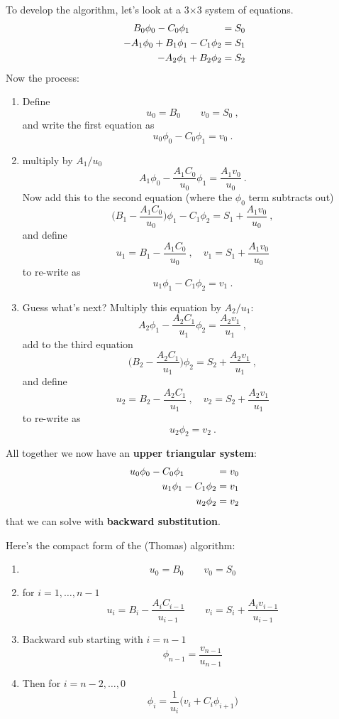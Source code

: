 \documentclass[12pt]{article}
\begin{document}
To develop the algorithm, let's look at a 3$\times$3 system of equations.
\begin{align}
B_0\phi_0 - C_0\phi_1 \hspace*{3.25em}&= S_0 \nonumber \\
-A_1\phi_0 + B_1\phi_1 - C_1\phi_2 &= S_1 \nonumber \\
-A_2\phi_1 + B_2\phi_2 &= S_2 \nonumber 
\end{align}
%
Now the process:
\begin{enumerate}
\item Define
\[u_0 = B_0 \qquad v_0 = S_0\:,\]
and write the first equation as
\[u_0\phi_0 - C_0\phi_1 = v_0\:.\]

\item multiply by $A_1 / u_0$
\[A_1\phi_0 - \frac{A_1 C_0}{u_0}\phi_1 = \frac{A_1 v_0}{u_0}\:.\]
Now add this to the second equation (where the $\phi_0$ term subtracts out)
\[\biggl(B_1-\frac{A_1 C_0}{u_0}\biggr)\phi_1 - C_1\phi_2 = S_1 + \frac{A_1 v_0}{u_0}\:,\]
%
and define
\[u_1 = B_1-\frac{A_1 C_0}{u_0}\:, \quad v_1 = S_1 + \frac{A_1 v_0}{u_0}\]
to re-write as
\[u_1\phi_1 - C_1\phi_2 = v_1\:.\]

\item Guess what's next? Multiply this equation by $A_2 / u_1$:
\[A_2\phi_1 - \frac{A_2 C_1}{u_1}\phi_2 = \frac{A_2 v_1}{u_1}\:,\]
add to the third equation
\[\biggl(B_2-\frac{A_2 C_1}{u_1}\biggr)\phi_2 = S_2 + \frac{A_2 v_1}{u_1}\:,\]
%
and define
\[u_2 = B_2-\frac{A_2 C_1}{u_1}\:, \quad v_2 = S_2 + \frac{A_2 v_1}{u_1}\]
to re-write as
\[u_2\phi_2 = v_2 \:.\]
\end{enumerate}
%
All together we now have an \textbf{upper triangular system}:
\begin{align}
u_0\phi_0 - C_0\phi_1 \hspace*{3.25em} &= v_0 \nonumber \\
u_1\phi_1 - C_1\phi_2 &= v_1 \nonumber \\
u_2\phi_2 &= v_2 \nonumber
\end{align}
%
that we can solve with \textbf{backward substitution}.

\clearpage
Here's the compact form of the (Thomas) algorithm:
\begin{enumerate}
\item \[u_0 = B_0 \qquad v_0 = S_0\]

\item for $i=1, \dots, n-1$
\[u_i = B_i-\frac{A_i C_{i-1}}{u_{i-1}} \qquad v_i = S_i + \frac{A_i v_{i-1}}{u_{i-1}}\]

\item Backward sub starting with $i=n-1$
\[\phi_{n-1} = \frac{v_{n-1}}{u_{n-1}}\]

\item Then for $i= n-2, \dots, 0$
\[\phi_i = \frac{1}{u_i}\bigl(v_i + C_i \phi_{i+1}\bigr)\]
\end{enumerate}
\end{document}
